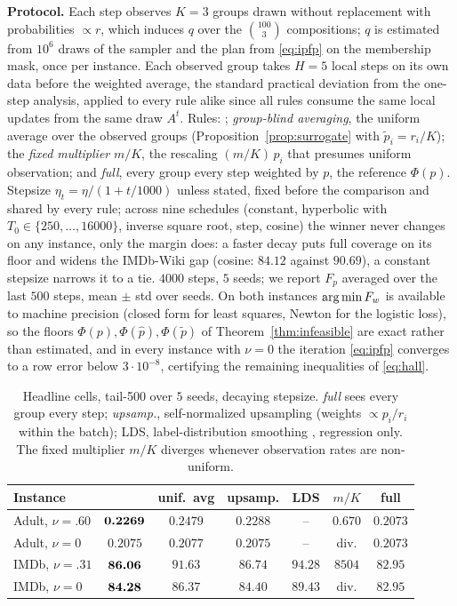 \noindent\textbf{Protocol.}
Each step observes $K{=}3$ groups drawn without replacement with
probabilities $\propto r$, which induces $q$ over the $\binom{100}{3}$
compositions; $q$ is estimated from $10^6$ draws of the sampler and the plan
from \eqref{eq:ipfp} on the membership mask, once per instance. Each
observed group takes $H{=}5$ local steps on its own data before the weighted
average, the standard practical deviation from the one-step analysis,
applied to every rule alike since all rules consume the same local updates
from the same draw $A^t$. Rules: \avot{}; \emph{group-blind averaging}, the
uniform average over the observed groups (Proposition~\ref{prop:surrogate}
with $\tilde p_i=r_i/K$); the \emph{fixed multiplier} $m/K$, the rescaling
$(m/K)\,p_i$ that presumes uniform observation; and \emph{full}, every group
every step weighted by $p$, the reference $\Phi(p)$. Stepsize
$\eta_t=\eta/(1+t/1000)$ unless stated, fixed before the comparison and
shared by every rule; across nine schedules (constant, hyperbolic with
$T_0\in\{250,\dots,16000\}$, inverse square root, step, cosine) the winner
never changes on any instance, only the margin does: a faster decay puts
full coverage on its floor and widens the IMDb-Wiki gap (cosine: $84.12$
against $90.69$), a constant stepsize narrows it to a tie. $4000$ steps, $5$
seeds; we report $F_p$ averaged over the last $500$ steps, mean $\pm$ std
over seeds. On both
instances $\operatorname*{arg\,min} F_w$ is available to machine precision (closed form for
least squares, Newton for the logistic loss), so the floors
$\Phi(p),\Phi(\hat p),\Phi(\tilde p)$ of Theorem~\ref{thm:infeasible} are
exact rather than estimated, and in every instance with $\nu=0$ the
iteration \eqref{eq:ipfp} converges to a row error below $3\cdot10^{-8}$,
certifying the remaining inequalities of \eqref{eq:hall}.

\begin{table}[t]
\centering
\caption{Headline cells, tail-500 over $5$ seeds, decaying stepsize. \emph{full}
sees every group every step; \emph{upsamp.}, self-normalized upsampling
(weights $\propto p_i/r_i$ within the batch); LDS, label-distribution
smoothing \cite{yang2021dir}, regression only. The fixed multiplier $m/K$
diverges whenever observation rates are non-uniform.}
\label{tab:overall}
\footnotesize\setlength{\tabcolsep}{2.2pt}
\begin{tabular}{lcccccc}
\toprule
Instance & \avot{} & unif.\ avg & upsamp. & LDS & $m/K$ & full \\
\midrule
Adult, $\nu{=}.60$ & $\textbf{0.2269}$ & $0.2479$ & $0.2288$ & -- & $0.670$ & $0.2073$ \\
Adult, $\nu{=}0$   & $0.2075$ & $0.2077$ & $0.2075$ & -- & div. & $0.2073$ \\
IMDb, $\nu{=}.31$  & $\textbf{86.06}$ & $91.63$ & $86.74$ & $94.28$ & $8504$ & $82.95$ \\
IMDb, $\nu{=}0$    & $\textbf{84.28}$ & $86.37$ & $84.40$ & $89.43$ & div. & $82.95$ \\
\bottomrule
\end{tabular}
\end{table}

